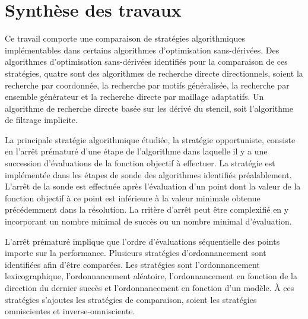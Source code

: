 \label{sec:Conclusion}
\section{Synthèse des travaux}
Ce travail comporte une comparaison de stratégies algorithmiques implémentables dans certains algorithmes d'optimisation sans-dérivées. Des algorithmes d'optimisation sans-dérivées identifiés pour la comparaison de ces stratégies, quatre sont des algorithmes de recherche directe directionnels, soient la recherche par coordonnée, la recherche par motifs généralisée, la recherche par ensemble générateur et la recherche directe par maillage adaptatifs. Un algorithme de recherche directe basée sur les dérivé du stencil, soit l'algorithme de filtrage implicite. 

La principale stratégie algorithmique étudiée, la stratégie opportuniste, consiste en l'arrêt prématuré d'une étape de l'algorithme dans laquelle il y a une succession d'évaluations de la fonction objectif à effectuer. La stratégie est implémentée dans les étapes de sonde des algorithmes identifiés préalablement. L'arrêt de la sonde est effectuée après l'évaluation d'un point dont la valeur de la fonction objectif à ce point est inférieure à la valeur minimale obtenue précédemment dans la résolution. La rritère d'arrêt peut être complexifié en y incorporant un nombre minimal de succès ou un nombre minimal d'évaluation.

L'arrêt prématuré implique que l'ordre d'évaluations séquentielle des points importe sur la performance. Plusieurs stratégies d'ordonnancement sont identifiées afin d'être comparées. Les stratégies sont l'ordonnancement lexicographique, l'ordonnancement aléatoire, l'ordonnancement en fonction de la direction du dernier succès et l'ordonnancement en fonction d'un modèle. À ces stratégies s'ajoutes les stratégies de comparaison, soient les stratégies omniscientes et inverse-omnisciente.

